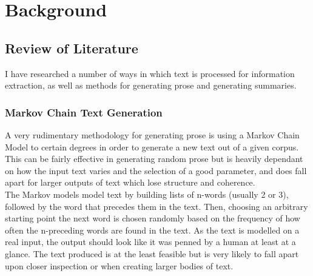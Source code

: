 \chapter{\label{ch:2-litreview}Background}


\section{Review of Literature}
I have researched a number of ways in which text is processed for information extraction, as well as methods for generating prose and generating summaries.
\subsection{Markov Chain Text Generation}
A very rudimentary methodology for generating prose is using a Markov Chain Model to certain degrees in order to generate a new text out of a given corpus. This can be fairly effective in generating random prose but is heavily dependant on how the input text varies and the selection of a good parameter, and does fall apart for larger outputs of text which lose structure and coherence.\\ %

The Markov models model text by building lists of n-words (usually 2 or 3), followed by the word that precedes them in the text. Then, choosing an arbitrary starting point the next word is chosen randomly based on the frequency of how often the n-preceding words are found in the text. As the text is modelled on a real input, the output should look like it was penned by a human at least at a glance. The text produced is at the least feasible but is very likely to fall apart upon closer inspection or when creating larger bodies of text.

